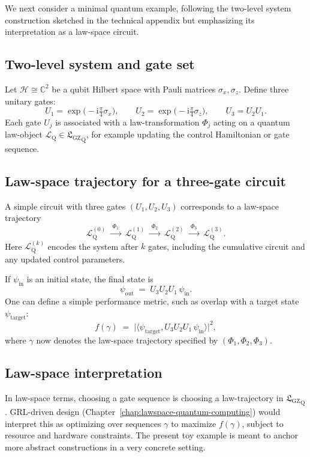\documentclass[11pt]{book}
\newcommand{\GZLS}{\ensuremath{\mathfrak{L}_{\mathrm{GZ}}}}
\theoremstyle{plain}
\theoremstyle{definition}
\theoremstyle{remark}
\begin{document}
We next consider a minimal quantum example, following the two-level
system construction sketched in the technical appendix but
emphasizing its interpretation as a law-space circuit.

\subsection*{Two-level system and gate set}

Let $\mathcal{H} \cong \mathbb{C}^2$ be a qubit Hilbert space with
Pauli matrices $\sigma_x,\sigma_z$. Define three unitary gates:
\[
   U_1 = \exp\!\bigl(-\mathrm{i} \tfrac{\pi}{4} \sigma_x\bigr),
   \qquad
   U_2 = \exp\!\bigl(-\mathrm{i} \tfrac{\pi}{4} \sigma_z\bigr),
   \qquad
   U_3 = U_2 U_1.
\]
Each gate $U_j$ is associated with a law-transformation
$\Phi_j$ acting on a quantum law-object
$\mathcal{L}_{\mathrm{Q}} \in {\GZLS}_{\mathrm{Q}}$, for example
updating the control Hamiltonian or gate sequence.

\subsection*{Law-space trajectory for a three-gate circuit}

A simple circuit with three gates $(U_1,U_2,U_3)$ corresponds to a
law-space trajectory
\[
   \mathcal{L}_{\mathrm{Q}}^{(0)}
   \;\xrightarrow{\;\Phi_1\;}\;
   \mathcal{L}_{\mathrm{Q}}^{(1)}
   \;\xrightarrow{\;\Phi_2\;}\;
   \mathcal{L}_{\mathrm{Q}}^{(2)}
   \;\xrightarrow{\;\Phi_3\;}\;
   \mathcal{L}_{\mathrm{Q}}^{(3)}.
\]
Here $\mathcal{L}_{\mathrm{Q}}^{(k)}$ encodes the system after $k$
gates, including the cumulative circuit and any updated control
parameters.

If $\psi_{\mathrm{in}}$ is an initial state, the final state is
\[
   \psi_{\mathrm{out}}
   \;=\;
   U_3 U_2 U_1 \,\psi_{\mathrm{in}}.
\]
One can define a simple performance metric, such as overlap with a
target state $\psi_{\mathrm{target}}$:
\[
   f(\gamma)
   \;=\;
   \bigl\lvert
   \langle \psi_{\mathrm{target}},
   U_3 U_2 U_1 \,\psi_{\mathrm{in}}\rangle
   \bigr\rvert^2,
\]
where $\gamma$ now denotes the law-space trajectory specified by
$(\Phi_1,\Phi_2,\Phi_3)$.

\subsection*{Law-space interpretation}

In law-space terms, choosing a gate sequence is choosing a
law-trajectory in ${\GZLS}_{\mathrm{Q}}$. GRL-driven design
(Chapter~\ref{chap:lawspace-quantum-computing}) would interpret
this as optimizing over sequences $\gamma$ to maximize $f(\gamma)$,
subject to resource and hardware constraints. The present toy
example is meant to anchor more abstract constructions in a very
concrete setting.
\end{document}
